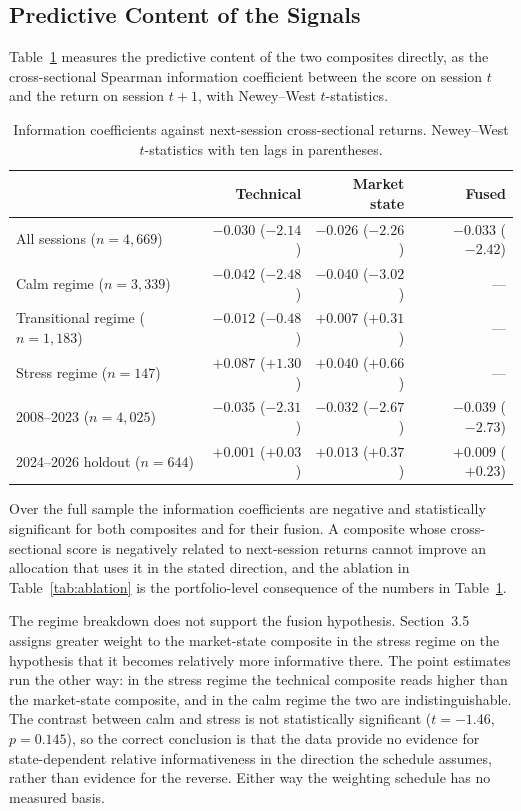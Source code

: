 \documentclass{singlecol-new}
\theoremstyle{TH}{
\newtheorem{lemma}{Lemma}
\newtheorem{theorem}[lemma]{Theorem}
\newtheorem{corrolary}[lemma]{Corrolary}
\newtheorem{conjecture}[lemma]{Conjecture}
\newtheorem{proposition}[lemma]{Proposition}
\newtheorem{claim}[lemma]{Claim}
\newtheorem{stheorem}[lemma]{Wrong Theorem}
\newtheorem{algorithm}{Algorithm}
}
\theoremstyle{THrm}{
\newtheorem{definition}{Definition}[section]
\newtheorem{question}{Question}[section]
\newtheorem{remark}{Remark}
\newtheorem{scheme}{Scheme}
}
\theoremstyle{THhit}{
\newtheorem{case}{Case}[section]
}
\begin{document}
\subsection{Predictive Content of the Signals}
\label{sec:ic}

Table~\ref{tab:ic} measures the predictive content of the two composites directly, as the
cross-sectional Spearman information coefficient between the score on session $t$ and
the return on session $t+1$, with Newey--West $t$-statistics.

\begin{table}[!ht]
\centering
\caption{Information coefficients against next-session cross-sectional returns.
Newey--West $t$-statistics with ten lags in parentheses.}
\label{tab:ic}
\small
\begin{tabular}{p{3.8cm}rrr}
\hline
& \textbf{Technical} & \textbf{Market state} & \textbf{Fused} \\
\hline
All sessions ($n=4{,}669$) & $-0.030$ ($-2.14$) & $-0.026$ ($-2.26$) & $-0.033$ ($-2.42$) \\
Calm regime ($n=3{,}339$) & $-0.042$ ($-2.48$) & $-0.040$ ($-3.02$) & --- \\
Transitional regime ($n=1{,}183$) & $-0.012$ ($-0.48$) & $+0.007$ ($+0.31$) & --- \\
Stress regime ($n=147$) & $+0.087$ ($+1.30$) & $+0.040$ ($+0.66$) & --- \\
\hline
2008--2023 ($n=4{,}025$) & $-0.035$ ($-2.31$) & $-0.032$ ($-2.67$) & $-0.039$ ($-2.73$) \\
2024--2026 holdout ($n=644$) & $+0.001$ ($+0.03$) & $+0.013$ ($+0.37$) & $+0.009$ ($+0.23$) \\
\hline
\end{tabular}
\end{table}

Over the full sample the information coefficients are negative and statistically
significant for both composites and for their fusion. A composite whose cross-sectional
score is negatively related to next-session returns cannot improve an allocation that
uses it in the stated direction, and the ablation in Table~\ref{tab:ablation} is the
portfolio-level consequence of the numbers in Table~\ref{tab:ic}.

The regime breakdown does not support the fusion hypothesis. Section~3.5 assigns greater
weight to the market-state composite in the stress regime on the hypothesis that it
becomes relatively more informative there. The point estimates run the other way: in the
stress regime the technical composite reads higher than the market-state composite, and
in the calm regime the two are indistinguishable. The contrast between calm and stress is
not statistically significant ($t = -1.46$, $p = 0.145$), so the correct conclusion is
that the data provide no evidence for state-dependent relative informativeness in the
direction the schedule assumes, rather than evidence for the reverse. Either way the
weighting schedule has no measured basis.
\end{document}
